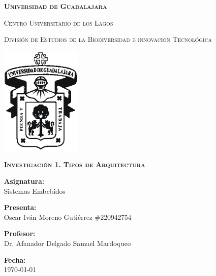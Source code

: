 \documentclass[12pt]{report}
\begin{document}
\setlength{\hoffset}{27 pt} %
\begin{titlepage}
{\centering
{\scshape\bfseries\fontsize{29.16}{34.992}\selectfont Universidad de Guadalajara \par}
\vspace{0.5cm}
{\scshape\Large Centro Universitario de los Lagos \par}
\vspace{1cm}
{\scshape\Large División de Estudios de la Biodiversidad e innovación Tecnológica \par}
\vspace{1cm}
{\graphicspath{{imagenes/Portada}} %
\includegraphics[width=0.3\textwidth]{image.png}\par}
\vspace{1cm}
{\scshape\large\bfseries Investigación 1. Tipos de Arquitectura \par}
\vspace{1.5cm}
{\large \textbf{Asignatura:} \\Sistemas Embebidos\par}
\vfill
{\large \textbf{Presenta:} \\Oscar Iván Moreno Gutiérrez \#220942754\par}
\vfill
{\large \textbf{Profesor:} \\Dr. Afanador Delgado Samuel Mardoqueo \par}
\vfill
\vfill
\begin{flushright}
  {\normalsize \textbf {Fecha:} \\ \today}
\end{flushright}
\vfill}
{\large  \par}
\end{titlepage}

\tableofcontents
\newpage
\end{document}
